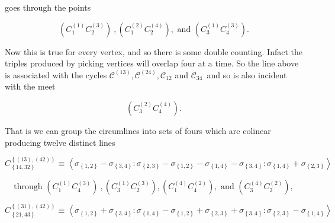\documentclass[11pt]{article}
\begin{document}
goes through the points

\begin{equation*}
\left( C_{1}^{\left( 1\right) }C_{2}^{\left( 3\right) }\right) \ ,\left(
C_{1}^{\left( 2\right) }C_{2}^{\left( 4\right) }\right) ,\text{ and }\left(
C_{3}^{\left( 1\right) }C_{4}^{\left( 3\right) }\right) .
\end{equation*}

Now this is true for every vertex, and so there is some double counting.
Infact the triples produced by picking vertices will overlap four at a time.
So the line above is associated with the cycles $\mathcal{C}^{\left(
13\right) },\mathcal{C}^{\left( 24\right) },\mathcal{C}_{12}$ and $\mathcal{C%
}_{34}$\ and so is also incident with the meet

\begin{equation*}
\left( C_{3}^{\left( 2\right) }C_{4}^{\left( 4\right) }\right) .
\end{equation*}

That is we can group the circumlines into sets of fours which are colinear
producing twelve distinct lines

\begin{equation*}
C_{\left\{ 14,32\right\} }^{\left\{ \left( 13\right) ,\left( 42\right)
\right\} }\equiv \left\langle \sigma _{\left\{ 1,2\right\} }-\sigma
_{\left\{ 3,4\right\} }:\sigma _{\left\{ 2,3\right\} }-\sigma _{\left\{
1,2\right\} }-\sigma _{\left\{ 1,4\right\} }-\sigma _{\left\{ 3,4\right\}
}:\sigma _{\left\{ 1,4\right\} }+\sigma _{\left\{ 2,3\right\} }\right\rangle 
\end{equation*}

\begin{equation*}
\text{through }\left( C_{1}^{\left( 1\right) }C_{4}^{\left( 3\right)
}\right) \ ,\left( C_{3}^{\left( 1\right) }C_{2}^{\left( 3\right) }\right)
,\left( C_{1}^{\left( 4\right) }C_{4}^{\left( 2\right) }\right) ,\text{ and }%
\left( C_{3}^{\left( 4\right) }C_{2}^{\left( 2\right) }\right) ,
\end{equation*}

\begin{equation*}
C_{\left\{ 21,43\right\} }^{\left\{ \left( 31\right) ,\left( 42\right)
\right\} }\equiv \left\langle \sigma _{\left\{ 1,2\right\} }+\sigma
_{\left\{ 3,4\right\} }:\sigma _{\left\{ 1,4\right\} }-\sigma _{\left\{
1,2\right\} }+\sigma _{\left\{ 2,3\right\} }+\sigma _{\left\{ 3,4\right\}
}:\sigma _{\left\{ 2,3\right\} }-\sigma _{\left\{ 1,4\right\} }\right\rangle 
\end{equation*}
\end{document}
